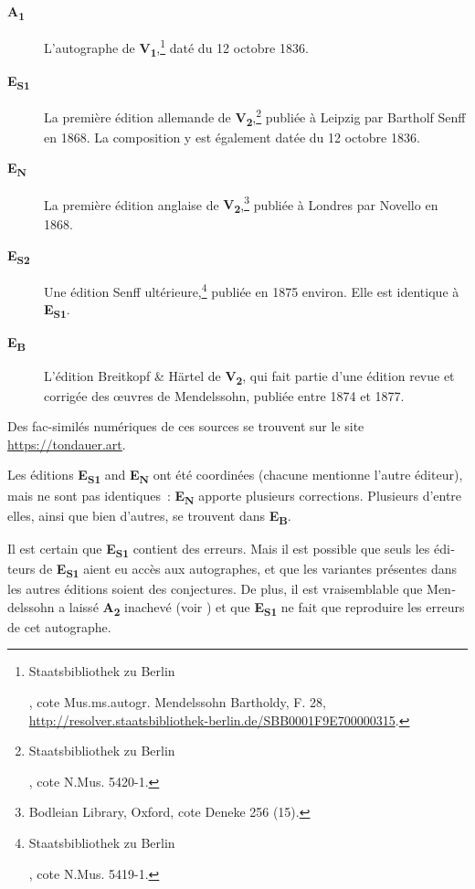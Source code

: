 \documentclass[a4paper, 12pt]{book}
\newcommand{\source}[2]{\textbf{#1\textsubscript{#2}}}
\begin{document}
{\begin{otherlanguage}{french}
    \begin{description}
    \item[\source{A}{1}] L'autographe de
      \source{V}{1},\footnote{\begin{otherlanguage}{ngerman}Staatsbibliothek
          zu Berlin\end{otherlanguage}, cote
          Mus.ms.autogr. Mendelssohn Bartholdy, F. 28,
          \url{http://resolver.staatsbibliothek-berlin.de/SBB0001F9E700000315}.}
      daté du 12 octobre 1836.
    \item[\source{E}{S1}] La première édition allemande de
      \source{V}{2},\footnote{\begin{otherlanguage}{ngerman}Staatsbibliothek
          zu Berlin\end{otherlanguage}, \foreignlanguage{french}{cote} N.Mus. 5420-1.}
      publiée à Leipzig par Bartholf Senff en 1868. La composition y est également
      datée du 12 octobre 1836.
    \item[\source{E}{N}] La première édition anglaise de
      \source{V}{2},\footnote{Bodleian Library, Oxford, \foreignlanguage{french}{cote}
        Deneke 256 (15).} publiée à Londres par Novello en 1868.
    \item[\source{E}{S2}] Une édition Senff
      ultérieure,\footnote{\begin{otherlanguage}{ngerman}Staatsbibliothek
      zu Berlin\end{otherlanguage}, \foreignlanguage{french}{cote} N.Mus. 5419-1.}
      publiée en 1875 environ. Elle est identique à \source{E}{S1}.
    \item[\source{E}{B}] L'édition Breitkopf \& Härtel de
      \source{V}{2},
      qui fait partie d'une édition revue et corrigée des \oe uvres de Mendelssohn,
      publiée entre 1874 et 1877.
    \end{description}

    Des fac-similés numériques de ces sources se trouvent sur le site
    \url{https://tondauer.art}.

    Les éditions \source{E}{S1} and \source{E}{N} ont été coordinées
    (chacune mentionne l'autre éditeur), mais ne sont pas identiques~:
    \source{E}{N} apporte plusieurs corrections. Plusieurs d'entre
    elles, ainsi que bien d'autres, se trouvent dans \source{E}{B}.

    Il est certain que \source{E}{S1} contient des erreurs. Mais il
    est possible que seuls les éditeurs de \source{E}{S1} aient eu
    accès aux autographes, et que les variantes présentes dans les
    autres éditions soient des conjectures. De plus, il est
    vraisemblable que Mendelssohn a laissé \source{A}{2} inachevé
    (voir ) et que \source{E}{S1} ne fait que
    reproduire les erreurs de cet autographe.


\end{otherlanguage}}
\end{document}
